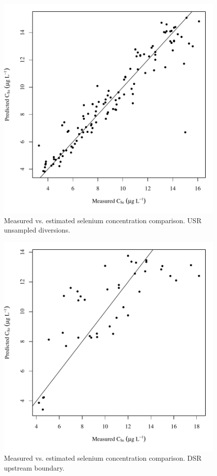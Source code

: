 \begin{figure}[htbp]
	\begin{center}
	\includegraphics[width=6in]{"Figures/Results_USR/Conc Model pred v meas UDIV"}
	\caption{Measured vs. estimated selenium concentration comparison.  USR unsampled diversions.}
	\end{center}
\end{figure}
\newpage

\begin{figure}[htbp]
	\begin{center}
	\includegraphics[width=6in]{"Figures/Results_DSR/Conc Model pred v meas D101C"}
	\caption{Measured vs. estimated selenium concentration comparison.  DSR upstream boundary.}
	\end{center}
\end{figure}
\newpage

